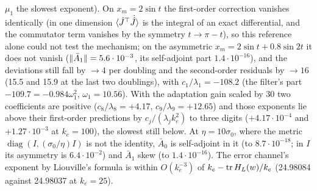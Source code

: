 \begin{sloppypar}
$\mu_1$ the slowest exponent). On $x_m = 2\sin t$ the first-order correction vanishes identically (in one dimension
$\langle\hat J^\top\dot{\hat J}\rangle$ is the integral of an exact differential, and the commutator term vanishes by
the symmetry $t\to\pi - t$), so this reference alone could not test the mechanism; on the asymmetric
$x_m = 2\sin t + 0.8\sin2t$ it does not vanish ($\lVert \bar A_1\rVert = 5.6\cdot10^{-3}$, its self-adjoint part
$1.4\cdot10^{-16}$), and the deviations still fall by $\to4$ per doubling and the second-order residuals by $\to16$
(15.5 and 15.9 at the last two doublings), with $c_1/\lambda_1 = -108.2$ (the filter's part
$-109.7 = -0.984\omega_1^2$, $\omega_1 = 10.56$). With the adaptation gain scaled by 30 two coefficients are positive
($c_8/\lambda_8 = +4.17$, $c_9/\lambda_9 = +12.65$) and those exponents lie above their first-order predictions by
$c_j/(\lambda_jk_e^2)$ to three digits ($+4.17\cdot10^{-4}$ and $+1.27\cdot10^{-3}$ at $k_e = 100$), the slowest
still below. At $\eta = 10\sigma_0$, where the metric $\operatorname{diag}(I,(\sigma_0/\eta)I)$ is not the identity,
$\bar A_0$ is self-adjoint in it (to $8.7\cdot10^{-18}$; in $I$ its asymmetry is $6.4\cdot10^{-2}$) and $\bar A_1$
skew (to $1.4\cdot10^{-16}$). The error channel's exponent by Liouville's formula is within $O(k_e^{-3})$ of
$k_e - \operatorname{tr} H_L(w)/k_e$ (24.98084 against 24.98037 at $k_e = 25$).
\end{sloppypar}

